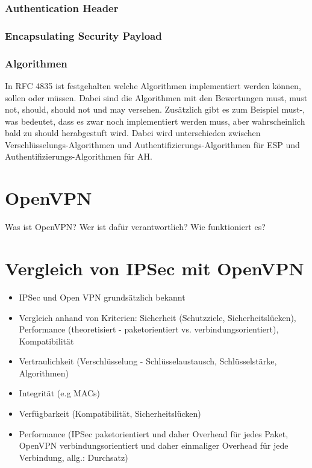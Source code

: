 \documentclass[12pt]{scrartcl}
\begin{document}
\subsubsection{Authentication Header}
\subsubsection{Encapsulating Security Payload}
\subsubsection{Algorithmen}
In RFC 4835 ist festgehalten welche Algorithmen implementiert werden können, sollen oder müssen. Dabei sind die Algorithmen mit den Bewertungen must, must not, should, should not und may versehen. Zusätzlich gibt es zum Beispiel must-, was bedeutet, dass es zwar noch implementiert werden muss, aber wahrscheinlich bald zu should herabgestuft wird. Dabei wird unterschieden zwischen Verschlüsselungs-Algorithmen und Authentifizierungs-Algorithmen für ESP und Authentifizierungs-Algorithmen für AH.  


\section{OpenVPN}
Was ist OpenVPN? Wer ist dafür verantwortlich? Wie funktioniert es? 
\section{Vergleich von IPSec mit OpenVPN}

\begin{itemize}
	\item IPSec und Open VPN grundsätzlich bekannt
	\item Vergleich anhand von Kriterien: Sicherheit (Schutzziele, Sicherheitslücken), Performance (theoretisiert - paketorientiert vs. verbindungsorientiert), Kompatibilität
	\item Vertraulichkeit (Verschlüsselung - Schlüsselaustausch, Schlüsselstärke, Algorithmen)
	\item Integrität (e.g MACs)
	\item Verfügbarkeit (Kompatibilität, Sicherheitslücken)
	\item Performance (IPSec paketorientiert und daher Overhead für jedes Paket, OpenVPN verbindungsorientiert und daher einmaliger Overhead für jede Verbindung, allg.: Durchsatz)
\end{itemize}
\end{document}
